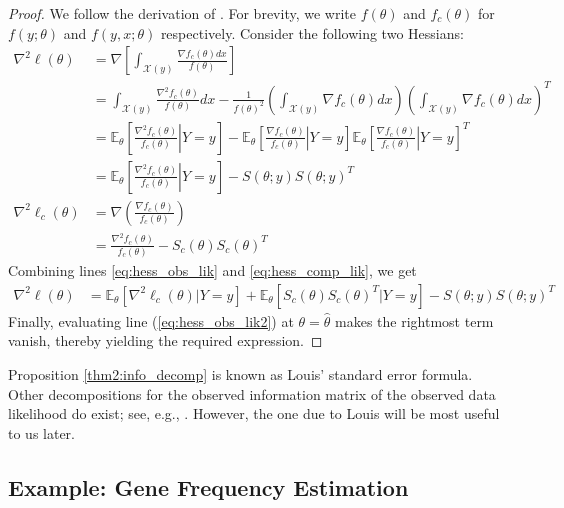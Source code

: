 \documentclass[11pt, oneside]{article}   	%
\newcommand{\bE}{\mathbb{E}}
\begin{document}
\begin{proof}
    We follow the derivation of \citet{Lou82}. For brevity, we write $f(\theta)$ and $f_c(\theta)$ for $f(y; \theta)$ and $f(y, x; \theta)$ respectively. Consider the following two Hessians:
    \begin{align}
        \nabla^2 \ell(\theta) &= \nabla \left[ \int_{\mathcal{X}(y)} \frac{\nabla f_c(\theta) dx}{f(\theta)} \right]\\
        &= \int_{\mathcal{X}(y)} \frac{\nabla^2 f_c(\theta)}{f(\theta)} dx - \frac{1}{f(\theta)^2}\left( \int_{\mathcal{X}(y)} \nabla f_c(\theta) dx \right) \left( \int_{\mathcal{X}(y)} \nabla f_c(\theta) dx \right)^T\\
        &= \bE_\theta \left[ \left. \frac{\nabla^2 f_c(\theta)}{f_c(\theta)} \right| Y=y \right] - \bE_\theta \left[ \left. \frac{\nabla f_c(\theta)}{f_c(\theta)} \right| Y=y \right] \bE_\theta \left[ \left. \frac{\nabla f_c(\theta)}{f_c(\theta)} \right| Y=y \right]^T\\
        &= \bE_\theta \left[ \left. \frac{\nabla^2 f_c(\theta)}{f_c(\theta)} \right| Y=y \right] - S(\theta; y) S(\theta; y)^T \label{eq:hess_obs_lik}\\
        \nabla^2 \ell_c(\theta) &= \nabla \left( \frac{\nabla f_c(\theta)}{f_c(\theta)} \right)\\
        &= \frac{\nabla^2 f_c(\theta)}{f_c(\theta)} - S_c(\theta) S_c(\theta)^T \label{eq:hess_comp_lik}
    \end{align}
    Combining lines \ref{eq:hess_obs_lik} and \ref{eq:hess_comp_lik}, we get
    \begin{align}
        \nabla^2 \ell(\theta) &= \bE_\theta [ \nabla^2 \ell_c(\theta) | Y=y] + \bE_\theta [ S_c(\theta) S_c(\theta)^T | Y=y] - S(\theta; y) S(\theta; y)^T \label{eq:hess_obs_lik2}
    \end{align}
    Finally, evaluating line (\ref{eq:hess_obs_lik2}) at $\theta = \hat{\theta}$ makes the rightmost term vanish, thereby yielding the required expression.
\end{proof}

Proposition \ref{thm2:info_decomp} is known as Louis' standard error formula. Other decompositions for the observed information matrix of the observed data likelihood do exist; see, e.g., \citet{Oak99,McL08}. However, the one due to Louis will be most useful to us later.

\subsection{Example: Gene Frequency Estimation}
\label{sec:eg-genes}
\end{document}
